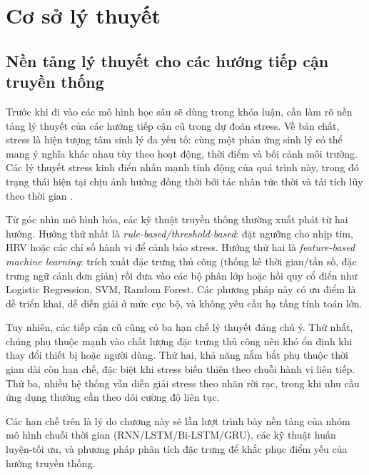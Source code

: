 
\chapter{Cơ sở lý thuyết}
\label{chap:theory}

\section{Nền tảng lý thuyết cho các hướng tiếp cận truyền thống}
\label{sec:traditional_foundations}

Trước khi đi vào các mô hình học sâu sẽ dùng trong khóa luận, cần làm rõ nền tảng lý thuyết của các hướng tiếp cận cũ trong dự đoán stress. Về bản chất, stress là hiện tượng tâm sinh lý đa yếu tố: cùng một phản ứng sinh lý có thể mang ý nghĩa khác nhau tùy theo hoạt động, thời điểm và bối cảnh môi trường. Các lý thuyết stress kinh điển nhấn mạnh tính động của quá trình này, trong đó trạng thái hiện tại chịu ảnh hưởng đồng thời bởi tác nhân tức thời và tải tích lũy theo thời gian \cite{chrousos2009stress, mcewen2008central}.

Từ góc nhìn mô hình hóa, các kỹ thuật truyền thống thường xuất phát từ hai hướng. Hướng thứ nhất là \textit{rule-based/threshold-based}: đặt ngưỡng cho nhịp tim, HRV hoặc các chỉ số hành vi để cảnh báo stress. Hướng thứ hai là \textit{feature-based machine learning}: trích xuất đặc trưng thủ công (thống kê thời gian/tần số, đặc trưng ngữ cảnh đơn giản) rồi đưa vào các bộ phân lớp hoặc hồi quy cổ điển như Logistic Regression, SVM, Random Forest. Các phương pháp này có ưu điểm là dễ triển khai, dễ diễn giải ở mức cục bộ, và không yêu cầu hạ tầng tính toán lớn.

Tuy nhiên, các tiếp cận cũ cũng có ba hạn chế lý thuyết đáng chú ý. Thứ nhất, chúng phụ thuộc mạnh vào chất lượng đặc trưng thủ công nên khó ổn định khi thay đổi thiết bị hoặc người dùng. Thứ hai, khả năng nắm bắt phụ thuộc thời gian dài còn hạn chế, đặc biệt khi stress biến thiên theo chuỗi hành vi liên tiếp. Thứ ba, nhiều hệ thống vẫn diễn giải stress theo nhãn rời rạc, trong khi nhu cầu ứng dụng thường cần theo dõi cường độ liên tục.

Các hạn chế trên là lý do chương này sẽ lần lượt trình bày nền tảng của nhóm mô hình chuỗi thời gian (RNN/LSTM/Bi-LSTM/GRU), các kỹ thuật huấn luyện-tối ưu, và phương pháp phân tích đặc trưng để khắc phục điểm yếu của hướng truyền thống.

